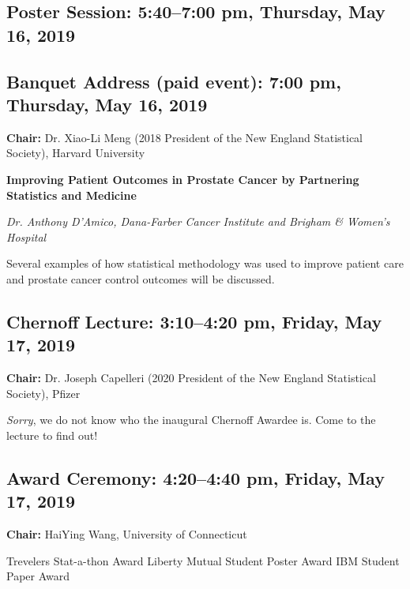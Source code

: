 \documentclass[10pt]{article}
\begin{document}
\subsection*{Poster Session: \hfill 5:40--7:00 pm, Thursday, May 16,  2019}

\subsection*{Banquet Address (paid event):  \hfill 7:00 pm, Thursday, May 16, 2019}

{\bf Chair:}
Dr. Xiao-Li Meng (2018 President of the New England
Statistical Society), Harvard University

\noindent
{\bf Improving Patient Outcomes in Prostate Cancer by Partnering
  Statistics and Medicine}

\emph{Dr. Anthony D'Amico, Dana-Farber Cancer Institute and Brigham \& Women's Hospital}

Several examples of how statistical methodology was used to improve
patient care and prostate cancer control outcomes will be discussed.


\subsection*{Chernoff Lecture: \hfill 3:10--4:20 pm, Friday, May 17, 2019}
{\bf Chair:}
Dr. Joseph Capelleri (2020 President of the New England
Statistical Society),  Pfizer

\emph{Sorry}, we do not know who the inaugural Chernoff Awardee is. Come to the
lecture to find out!

\subsection*{Award Ceremony: \hfill 4:20--4:40 pm, Friday, May 17, 2019}

{\bf Chair:} HaiYing Wang, University of Connecticut

Trevelers Stat-a-thon Award\hfill
Liberty Mutual Student Poster Award \hfill
IBM Student Paper Award
\end{document}
